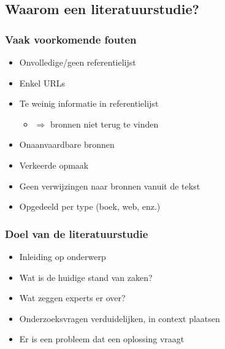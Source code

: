 \documentclass[aspectratio=169]{beamer}
\begin{document}
\subsection{Waarom een literatuurstudie?}


\begin{frame}
  \frametitle{Vaak voorkomende fouten}

  \begin{itemize}
    \item Onvolledige/geen referentielijst
    \item Enkel URLs
    \item Te weinig informatie in referentielijst
      \begin{itemize}
        \item $\Rightarrow$ bronnen niet terug te vinden
      \end{itemize}
    \item Onaanvaardbare bronnen
    \item Verkeerde opmaak
    \item Geen verwijzingen naar bronnen vanuit de tekst
    \item Opgedeeld per type (boek, web, enz.)
  \end{itemize}
\end{frame}

\begin{frame}
  \frametitle{Doel van de literatuurstudie}

  \begin{itemize}
    \item Inleiding op onderwerp
    \item Wat is de huidige stand van zaken?
    \item Wat zeggen experts er over?
    \item Onderzoeksvragen verduidelijken, in context plaatsen
    \item Er is een probleem dat een oplossing vraagt
  \end{itemize}

  \vfill

\end{frame}
\end{document}
